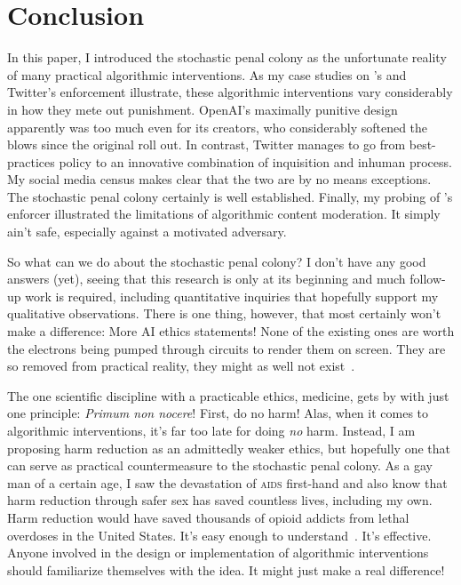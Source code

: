 
\section{Conclusion}
\label{sec:conclusion}

In this paper, I introduced the stochastic penal colony as the unfortunate
reality of many practical algorithmic interventions. As my case studies on
\DALLE's and Twitter's enforcement illustrate, these algorithmic interventions
vary considerably in how they mete out punishment. OpenAI's maximally punitive
design apparently was too much even for its creators, who considerably softened
the blows since the original roll out. In contrast, Twitter manages to go from
best-practices policy to an innovative combination of inquisition and inhuman
process. My social media census makes clear that the two are by no means
exceptions. The stochastic penal colony certainly is well established. Finally,
my probing of \DALLE's enforcer illustrated the limitations of algorithmic
content moderation. It simply ain't safe, especially against a motivated
adversary.

So what can we do about the stochastic penal colony? I don't have any good
answers (yet), seeing that this research is only at its beginning and much
follow-up work is required, including quantitative inquiries that hopefully
support my qualitative observations. There is one thing, however, that most
certainly won't make a difference: More AI ethics statements! None of the
existing ones are worth the electrons being pumped through circuits to render
them on screen. They are so removed from practical reality, they might as well
not exist~\cite{Hagendorff2022,Munn2022,WhittlestoneNyrupea2019}.

The one scientific discipline with a practicable ethics, medicine, gets by with
just one principle: \emph{Primum non nocere}! First, do no harm! Alas, when it
comes to algorithmic interventions, it's far too late for doing \emph{no} harm.
Instead, I am proposing harm reduction as an admittedly weaker \AI{} ethics, but
hopefully one that can serve as practical countermeasure to the stochastic penal
colony. As a gay man of a certain age, I saw the devastation of \textsc{aids}
first-hand and also know that harm reduction through safer sex has saved
countless lives, including my own. Harm reduction would have saved thousands of
opioid addicts from lethal overdoses in the United States. It's easy enough to
understand~\cite{HarmReductionInternational2020,HarmReductionInternational2022,MarlattLarimerea2011,OpenSocietyFoundations2021}.
It's effective. Anyone involved in the design or implementation of algorithmic
interventions should familiarize themselves with the idea. It might just make a
real difference!
